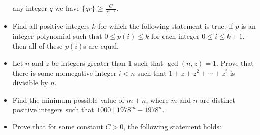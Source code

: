 \begin{itemize}
    any integer $q$ we have $\{qr\}\ge \frac C{q^{d-1}}$.
  \item Find all positive integers $k$ for which the following statement is
    true: if $p$ is an integer polynomial such that $0\le p(i)\le k$ for each
    integer $0\le i\le k+1$, then all of these $p(i)$s are equal.
  \item Let $n$ and $z$ be integers greater than $1$ such that $\gcd(n,z)=1$.
    Prove that there is some nonnegative integer $i<n$ such that
    $1+z+z^2+\cdots+z^i$ is divisible by $n$.
  \item Find the minimum possible value of $m+n$, where $m$ and $n$ are distinct
    positive integers such that $1000\mid 1978^m-1978^n$.
  \item Prove that for some constant $C>0$, the following statement holds:


\end{itemize}
